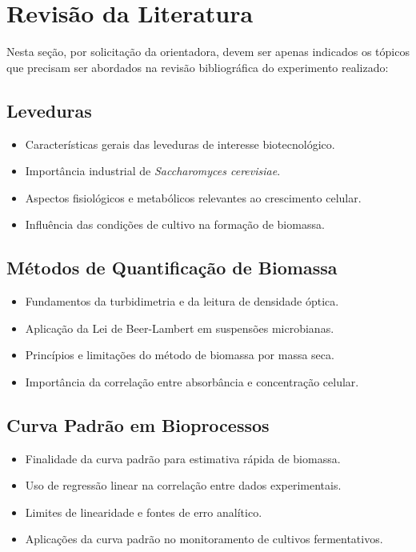 
\section{Revisão da Literatura}

Nesta seção, por solicitação da orientadora, devem ser apenas indicados os tópicos que precisam ser abordados na revisão bibliográfica do experimento realizado:

\subsection{Leveduras}
\begin{itemize}
    \item Características gerais das leveduras de interesse biotecnológico.
    \item Importância industrial de \textit{Saccharomyces cerevisiae}.
    \item Aspectos fisiológicos e metabólicos relevantes ao crescimento celular.
    \item Influência das condições de cultivo na formação de biomassa.
\end{itemize}

\subsection{Métodos de Quantificação de Biomassa}
\begin{itemize}
    \item Fundamentos da turbidimetria e da leitura de densidade óptica.
    \item Aplicação da Lei de Beer-Lambert em suspensões microbianas.
    \item Princípios e limitações do método de biomassa por massa seca.
    \item Importância da correlação entre absorbância e concentração celular.
\end{itemize}

\subsection{Curva Padrão em Bioprocessos}
\begin{itemize}
    \item Finalidade da curva padrão para estimativa rápida de biomassa.
    \item Uso de regressão linear na correlação entre dados experimentais.
    \item Limites de linearidade e fontes de erro analítico.
    \item Aplicações da curva padrão no monitoramento de cultivos fermentativos.
\end{itemize}
